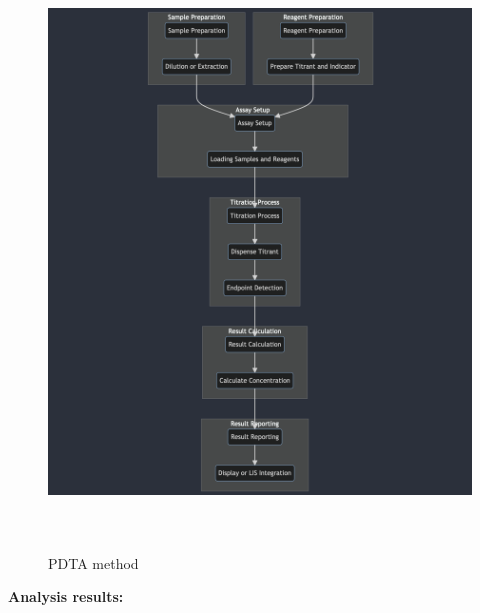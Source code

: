 \documentclass[
  11pt,
  letterpaper,
  DIV=11,
  numbers=noendperiod]{scrreprt}
\begin{document}
\begin{figure}[H]

{\centering \includegraphics[width=5.5in,height=6.19792in]{Beyond the Sterile Walls e0cff5645ec24545a8c247940fff8e84/Untitled 8.png}

}

\caption{PDTA method}

\end{figure}%

\textbf{Analysis results:}
\end{document}
